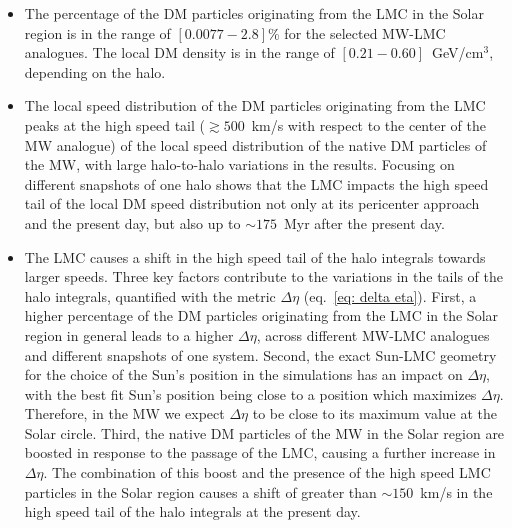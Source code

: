 \begin{itemize}

\item The percentage of the DM particles originating from the LMC  in the Solar region is in the range of $[0.0077-2.8]$\% for the selected MW-LMC analogues. The local DM density is in the range of $[0.21-0.60]$~GeV/cm$^3$, depending on the halo.

\item The local speed distribution of the DM particles originating from the LMC peaks at the high speed tail ($\gtrsim 500$~km/s with respect to the  center of the MW analogue) of the local speed distribution of the native DM particles of the MW, with large halo-to-halo variations in the results. Focusing on different snapshots of one halo shows that the LMC impacts the high speed tail of the local DM speed distribution not only at its pericenter approach and the present day, but also up to $\sim 175$~Myr after the present day.

\item The LMC causes a shift in the high speed tail of the halo integrals towards larger speeds. Three key factors contribute to the variations in the tails of the halo integrals, quantified with the metric $\Delta \eta$ (eq.~\eqref{eq: delta eta}). First, a higher percentage of the DM particles originating from the LMC in the Solar region in general leads to a higher $\Delta \eta$, across different MW-LMC analogues and different snapshots of one system. Second, the exact Sun-LMC geometry for the choice of the Sun's position in the simulations 
has an impact on $\Delta \eta$, with the best fit Sun's position being close to a position which maximizes $\Delta \eta$. Therefore, in the MW we expect $\Delta \eta$ to be close to its maximum value at the Solar circle. Third, 
the native DM particles of the MW in the Solar region are boosted in response to the passage of the LMC, causing a further increase in $\Delta \eta$. The combination of  this boost and the presence of the high speed LMC particles in the Solar region causes a shift of greater than $\sim 150$~km/s in the high speed tail of the halo integrals at the present day.


\end{itemize}
